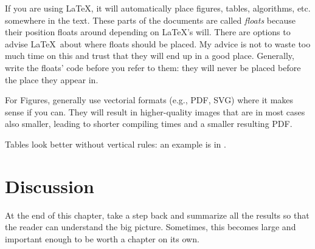 If you are using \LaTeX, it will automatically place figures, tables, algorithms, etc. somewhere in the text.
These parts of the documents are called \emph{floats} because their position floats around depending on \LaTeX's will.
There are options to advise \LaTeX\ about where floats should be placed. My advice is not to waste too much time on this
and trust that they will end up in a good place. Generally, write the floats' code before you refer to them: they will
never be placed before the place they appear in.

For Figures, generally use vectorial formats (e.g., PDF, SVG) where it makes sense if you can.
They will result in higher-quality images that are in most cases also smaller, leading to
shorter compiling times and a smaller resulting PDF.

Tables look better without vertical rules: an example is in .

\section{Discussion}

At the end of this chapter, take a step back and summarize all the results so that the reader
can understand the big picture. Sometimes, this becomes large and important enough to be worth
a chapter on its own.
